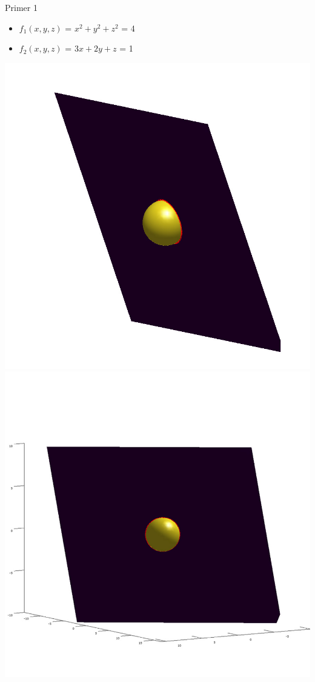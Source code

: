 \documentclass{beamer}
\begin{document}
\begin{frame}{Primer 1}
		\begin{itemize} 
			\item $f_{1}(x,y,z)$ = $x^2 + y^2 + z^2$ = 4
			\item $f_{2}(x,y,z)$ = $3x + 2y + z$ = 1	
		\end{itemize} 
		\includegraphics[scale=0.3]{primer1_1}
		\includegraphics[scale=0.3]{primer1_2}
	\end{frame}
	
\end{document}
